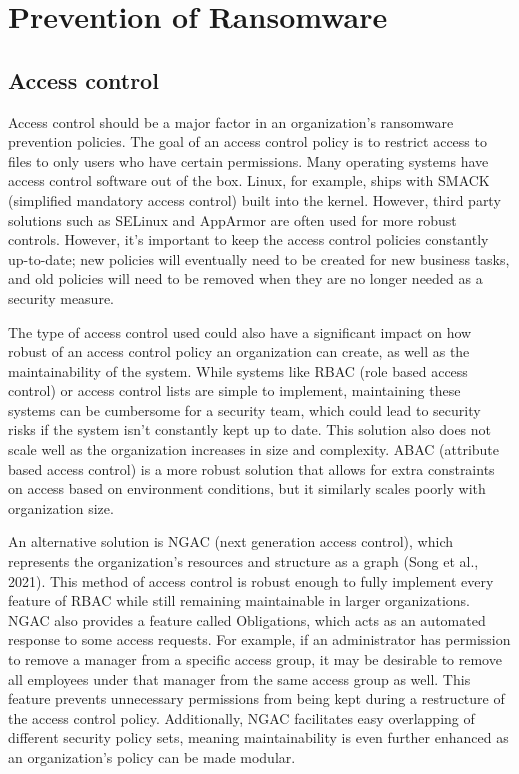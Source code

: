 \documentclass[11pt]{article}
\begin{document}
\section{Prevention of Ransomware}
\label{sec:orgd250462}
\subsection{Access control}
\label{sec:org3470fe9}
Access control should be a major factor in an organization's ransomware prevention policies. The goal of an access control policy is to restrict access to files to only users who have certain permissions. Many operating systems have access control software out of the box. Linux, for example, ships with SMACK (simplified mandatory access control) built into the kernel. However, third party solutions such as SELinux and AppArmor are often used for more robust controls. However, it's important to keep the access control policies constantly up-to-date; new policies will eventually need to be created for new business tasks, and old policies will need to be removed when they are no longer needed as a security measure.

The type of access control used could also have a significant impact on how robust of an access control policy an organization can create, as well as the maintainability of the system. While systems like RBAC (role based access control) or access control lists are simple to implement, maintaining these systems can be cumbersome for a security team, which could lead to security risks if the system isn't constantly kept up to date. This solution also does not scale well as the organization increases in size and complexity. ABAC (attribute based access control) is a more robust solution that allows for extra constraints on access based on environment conditions, but it similarly scales poorly with organization size.

An alternative solution is NGAC (next generation access control), which represents the organization's resources and structure as a graph (Song et al., 2021). This method of access control is robust enough to fully implement every feature of RBAC while still remaining maintainable in larger organizations. NGAC also provides a feature called Obligations, which acts as an automated response to some access requests. For example, if an administrator has permission to remove a manager from a specific access group, it may be desirable to remove all employees under that manager from the same access group as well. This feature prevents unnecessary permissions from being kept during a restructure of the access control policy. Additionally, NGAC facilitates easy overlapping of different security policy sets, meaning maintainability is even further enhanced as an organization's policy can be made modular.
\end{document}
